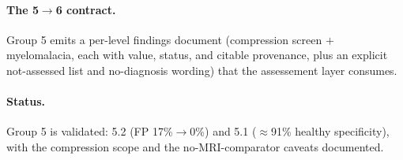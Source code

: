 \paragraph{The 5$\rightarrow$6 contract.} Group 5 emits a per-level findings document (compression screen
$+$ myelomalacia, each with value, status, and citable provenance, plus an explicit not-assessed list and
no-diagnosis wording) that the assessement layer consumes.

\paragraph{Status.} Group 5 is validated: 5.2 (FP 17\%$\rightarrow$0\%) and 5.1 ($\approx$91\% healthy
specificity), with the compression scope and the no-MRI-comparator caveats documented.
